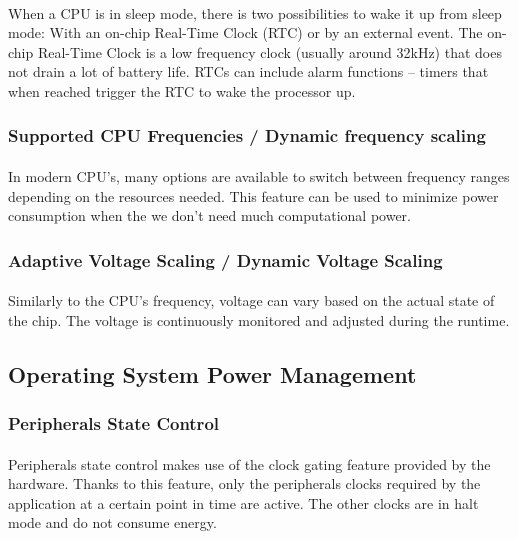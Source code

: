 \paragraph{}
When a CPU is in sleep mode, there is two possibilities to wake it up from sleep mode: %
With an on-chip Real-Time Clock (RTC) or by an external event.
The on-chip Real-Time Clock is a low frequency clock (usually around 32kHz) that does not drain a lot of battery life.
RTCs can include alarm functions – timers that when reached trigger the RTC to wake the processor up.

\subsubsection{Supported CPU Frequencies / Dynamic frequency scaling}
\paragraph{}
In modern CPU's, many options are available to switch between frequency ranges depending on the resources needed.
This feature can be used to minimize power consumption when the we don't need much computational power.

\subsubsection{Adaptive Voltage Scaling / Dynamic Voltage Scaling}
\paragraph{}
Similarly to the CPU's frequency, voltage can vary based on the actual state of the chip.
The voltage is continuously monitored and adjusted during the runtime.


\subsection{Operating System Power Management}

\subsubsection{Peripherals State Control}
\paragraph{}
Peripherals state control makes use of the clock gating feature provided by the hardware.
Thanks to this feature, only the peripherals clocks required by the application at a certain point in time are active.
The other clocks are in halt mode and do not consume energy.


